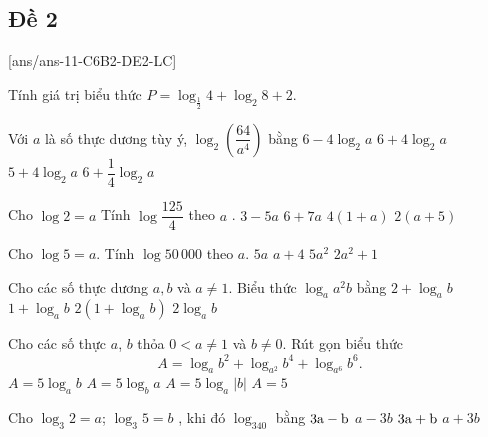 \subsection{Đề 2}
[ans/ans-11-C6B2-DE2-LC]
\caulc
	\begin{ex}%
		Tính giá trị biểu thức $P=\log_{\tfrac{1}{2}} 4+\log_2 8+2$.
	\end{ex}
	\begin{ex}%
		Với $ a$ là số thực dương tùy ý, $\log_2\left(\dfrac{64}{a^4}\right)$ bằng
		\choice
		{\True $ 6-4\log_2a$}
		{$ 6+4\log_2a$}
		{$ 5+4\log_2a$}
		{$ 6+\dfrac{1}{4}\log_2a$}
	\end{ex}
	\begin{ex}%
		Cho $\log 2=a$ Tính $\log\dfrac{125}{4}$ theo $a$ .
		\choice
		{\True $3-5a$}
		{$6+7a$}
		{$4\left(1+a\right)$}
		{$2\left(a+5\right)$}
	\end{ex}
	\begin{ex}%
		Cho $\log 5=a$. Tính $\log 50\,000$ theo $ a$.
		\choice
		{$ 5a$}
		{\True $ a+4$}
		{$ 5a^2$}
		{$ 2a^2+1$}
	\end{ex}
	\begin{ex}%
		Cho các số thực dương $ a,b$ và $ a\ne 1$. Biểu thức $\log_a{a^2}b$ bằng
		\choice
		{\True $ 2+\log_ab$}
		{$ 1+\log_ab$}
		{$ 2\left(1+\log_ab\right)$}
		{$ 2\log_ab$}
	\end{ex}
	\begin{ex}%
		Cho các số thực $ a$, $ b$ thỏa $ 0 < a\ne 1$ và $ b\ne 0$. Rút gọn biểu thức $$ A=\log_a{b^2}+\log_{a^2}{b^4}+\log_{a^6}{b^6}.$$
		\choice
		{$ A=5\log_ab$}
		{$ A=5\log_ba$}
		{\True $ A=5\log_a\left| b\right|$}
		{$ A=5$}
	\end{ex}
	\begin{ex}%
		Cho $\log_3 2=a$; $\log_3 5=b$ , khi đó $\log_340$ bằng
		\choice
		{$3\rm{a}-b$}
		{$a-3b$}
		{\True $3\rm{a}+b$}
		{$a+3b$}
	\end{ex}
